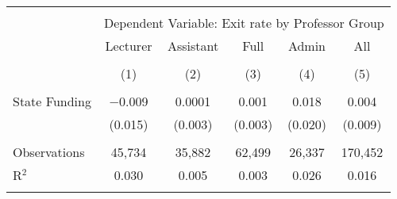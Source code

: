 
\begin{tabular}{@{\extracolsep{5pt}}lccccc} 
\\[-1.8ex]\hline 
\hline \\[-1.8ex] 
 & \multicolumn{5}{c}{Dependent Variable: Exit rate by Professor Group} \\ 
\cline{2-6} 
 & Lecturer & Assistant & Full & Admin & All \\ 
\\[-1.8ex] & (1) & (2) & (3) & (4) & (5)\\ 
\hline \\[-1.8ex] 
 State Funding & $-$0.009 & 0.0001 & 0.001 & 0.018 & 0.004 \\ 
  & (0.015) & (0.003) & (0.003) & (0.020) & (0.009) \\ 
 \hline \\[-1.8ex] 
Observations & 45,734 & 35,882 & 62,499 & 26,337 & 170,452 \\ 
R$^{2}$ & 0.030 & 0.005 & 0.003 & 0.026 & 0.016 \\ 
\hline 
\hline \\[-1.8ex] 
\end{tabular} 
